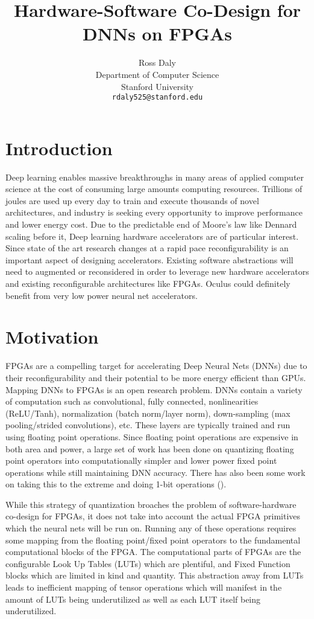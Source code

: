 \documentclass{article}
\title{Hardware-Software Co-Design for DNNs on FPGAs}
\author{
  Ross Daly\\
  Department of Computer Science\\
  Stanford University\\
  \texttt{rdaly525@stanford.edu} \\
}
\begin{document}

\maketitle

\section{Introduction}
Deep learning enables massive breakthroughs in many areas of applied computer science at the cost of consuming large amounts computing resources. Trillions of joules are used up every day to train and execute thousands of novel architectures, and industry is seeking every opportunity to improve performance and lower energy cost. Due to the predictable end of Moore’s law like Dennard scaling before it, Deep learning hardware accelerators are of particular interest. Since state of the art research changes at a rapid pace reconfigurability is an important aspect of designing accelerators. Existing software abstractions will need to augmented or reconsidered in order to leverage new hardware accelerators and existing reconfigurable architectures like FPGAs. Oculus could definitely benefit from very low power neural net accelerators. 

\section{Motivation}
FPGAs are a compelling target for accelerating Deep Neural Nets (DNNs) due to their reconfigurability and their potential to be more energy efficient than GPUs. Mapping DNNs to FPGAs is an open research problem. DNNs contain a variety of computation such as convolutional, fully connected, nonlinearities (ReLU/Tanh), normalization (batch norm/layer norm), down-sampling (max pooling/strided convolutions), etc. These layers are typically trained and run using floating point operations. Since floating point operations are expensive in both area and power, a large set of work has been done on quantizing floating point operators into computationally simpler and lower power fixed point operations while still maintaining DNN accuracy. There has also been some work on taking this to the extreme and doing 1-bit operations (\cite{rastegari2016xnor}).

While this strategy of quantization broaches the problem of software-hardware co-design for FPGAs, it does not take into account the actual FPGA primitives which the neural nets will be run on. Running any of these operations requires some mapping from the floating point/fixed point operators to the fundamental computational blocks of the FPGA. The computational parts of FPGAs are the configurable Look Up Tables (LUTs) which are plentiful, and Fixed Function blocks which are limited in kind and quantity. 
This abstraction away from LUTs leads to inefficient mapping of tensor operations which will manifest in the amount of LUTs being underutilized as well as each LUT itself being underutilized. 
\end{document}
